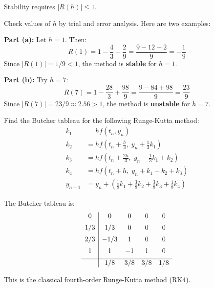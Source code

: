 \documentclass[reqno]{exam}
\begin{document}
\begin{questions}
\begin{solution}
Stability requires $|R(h)| \leq 1$.

Check values of $h$ by trial and error analysis. Here are two examples:

\textbf{Part (a):} Let $h = 1$. Then:
$$R(1) = 1 - \frac{4}{3} + \frac{2}{9} = \frac{9 - 12 + 2}{9} = -\frac{1}{9}$$
Since $|R(1)| = 1/9 < 1$, the method is \textbf{stable} for $h = 1$.

\textbf{Part (b):} 
Try $h = 7$:
$$R(7) = 1 - \frac{28}{3} + \frac{98}{9} = \frac{9 - 84 + 98}{9} = \frac{23}{9}$$
Since $|R(7)| = 23/9 \approx 2.56 > 1$, the method is \textbf{unstable} for $h = 7$.
\end{solution}

\newpage 

\question[5]
Find the Butcher tableau for the following Runge-Kutta method:
\begin{align*}
k_1 &= hf(t_n, y_n)\\
k_2 &= hf\!\left(t_n + \tfrac{h}{3},\; y_n + \tfrac{1}{3} k_1\right)\\
k_3 &= hf\!\left(t_n + \tfrac{2h}{3},\; y_n - \tfrac{1}{3} k_1 +  k_2\right)\\
k_4 &= hf(t_n + h,\; y_n +  k_1 -  k_2 +  k_3)\\
y_{n+1} &= y_n + \left(\tfrac{1}{8}k_1 + \tfrac{3}{8}k_2 + \tfrac{3}{8}k_3 + \tfrac{1}{8}k_4\right)
\end{align*}

\begin{solution}
The Butcher tableau is:
\begin{equation*}
\begin{array}{c|cccc}
0   & 0    & 0    & 0   & 0   \\[0.5em]
1/3 & 1/3  & 0    & 0   & 0   \\[0.5em]
2/3 & -1/3 & 1    & 0   & 0   \\[0.5em]
1   & 1    & -1   & 1   & 0   \\[0.5em]
\hline
    & 1/8  & 3/8  & 3/8 & 1/8 \\
\end{array}
\end{equation*}

This is the classical fourth-order Runge-Kutta method (RK4).
\end{solution}

\end{questions}
\end{document}
